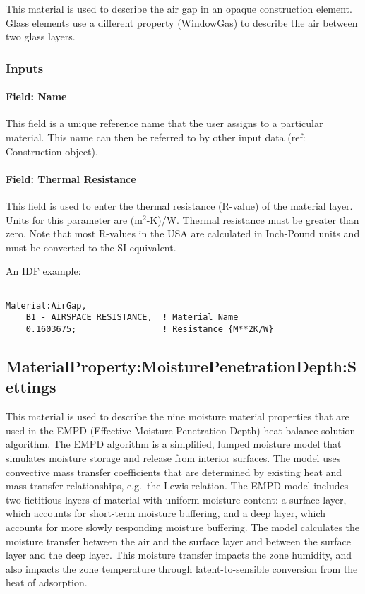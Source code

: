 This material is used to describe the air gap in an opaque construction element. Glass elements use a different property (WindowGas) to describe the air between two glass layers.

\subsubsection{Inputs}\label{inputs-3-036}

\paragraph{Field: Name}\label{field-name-3-031}

This field is a unique reference name that the user assigns to a particular material. This name can then be referred to by other input data (ref: Construction object).

\paragraph{Field: Thermal Resistance}\label{field-thermal-resistance-1}

This field is used to enter the thermal resistance (R-value) of the material layer. Units for this parameter are (m\(^{2}\)-K)/W. Thermal resistance must be greater than zero. Note that most R-values in the USA are calculated in Inch-Pound units and must be converted to the SI equivalent.

An IDF example:

\begin{lstlisting}

Material:AirGap,
    B1 - AIRSPACE RESISTANCE,  ! Material Name
    0.1603675;                 ! Resistance {M**2K/W}
\end{lstlisting}

\subsection{MaterialProperty:MoisturePenetrationDepth:Settings}\label{materialpropertymoisturepenetrationdepthsettings}

This material is used to describe the nine moisture material properties that are used in the EMPD (Effective Moisture Penetration Depth) heat balance solution algorithm. The EMPD algorithm is a simplified, lumped moisture model that simulates moisture storage and release from interior surfaces. The model uses convective mass transfer coefficients that are determined by existing heat and mass transfer relationships, e.g.~the Lewis relation. The EMPD model includes two fictitious layers of material with uniform moisture content: a surface layer, which accounts for short-term moisture buffering, and a deep layer, which accounts for more slowly responding moisture buffering. The model calculates the moisture transfer between the air and the surface layer and between the surface layer and the deep layer. This moisture transfer impacts the zone humidity, and also impacts the zone temperature through latent-to-sensible conversion from the heat of adsorption.

